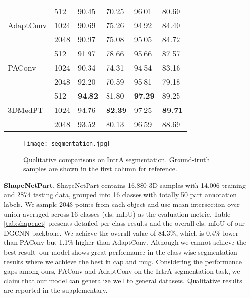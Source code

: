 \documentclass[10pt,twocolumn,letterpaper]{article}
\begin{document}
\begin{table}
\begin{tabular}{l|lllll}
\hline
\multirow{3}{*}{AdaptConv \cite{adapconv}}          & \cellcolor{Apricot}512  & \cellcolor{Apricot}90.45 & \cellcolor{Apricot}70.25 & \cellcolor{Apricot}96.01 & \cellcolor{Apricot}80.60 \\
                                                    & 1024 & 90.69 & 75.26 & 94.92 & 84.40 \\
                                                    & \cellcolor{Lavender}2048 & \cellcolor{Lavender}90.97 & \cellcolor{Lavender}75.08 & \cellcolor{Lavender}95.05 & \cellcolor{Lavender}84.72 \\ 
\hline
\multirow{3}{*}{PAConv \cite{paconv}}               & \cellcolor{Apricot}512  & \cellcolor{Apricot}91.97 & \cellcolor{Apricot}78.66 & \cellcolor{Apricot}95.66 & \cellcolor{Apricot}87.57 \\
                                                    & 1024 & 90.34 & 74.31 & 94.54 & 83.16 \\
                                                    & \cellcolor{Lavender}2048 & \cellcolor{Lavender}92.20 & \cellcolor{Lavender}70.59 & \cellcolor{Lavender}95.81 & \cellcolor{Lavender}79.18 \\ 
\hline
\multirow{3}{*}{3DMedPT}                        & \cellcolor{Apricot}512 & \cellcolor{Apricot}\textbf{94.82} & \cellcolor{Apricot}81.80 & \cellcolor{Apricot}\textbf{97.29} & \cellcolor{Apricot}89.25  \\
                                                & 1024 & 94.76 & \textbf{82.39} & 97.25 & \textbf{89.71} \\
                                                & \cellcolor{Lavender}2048 & \cellcolor{Lavender}93.52 & \cellcolor{Lavender}80.13 & \cellcolor{Lavender}96.59 & \cellcolor{Lavender}88.69 \\
\bottomrule
\end{tabular}
\end{table}

\begin{figure}
\centering
\texttt{[image: segmentation.jpg]}
\caption{Qualitative comparisons on IntrA segmentation. Ground-truth samples are shown in the first column for reference.} \label{fig:seg_result}
\end{figure}

\noindent \textbf{ShapeNetPart.}
ShapeNetPart \cite{shapenet} contains 16,880 3D samples with 14,006 training and 2874 testing data, grouped into 16 classes with totally 50 part annotation labels.
We sample 2048 points from each object and use mean intersection over union averaged across 16 classes (cls. mIoU) as the evaluation metric.
Table \ref{tab:shapenet} presents detailed per-class results and the overall cls. mIoU of our DGCNN backbone.
We achieve the overall value of 84.3\%, which is 0.4\% lower than PAConv but 1.1\% higher than AdaptConv.
Although we cannot achieve the best result, our model shows great performance in the class-wise segmentation results where we achieve the best in cap and mug.
Considering the performance gaps among ours, PAConv and AdaptConv on the IntrA segmentation task, we claim that our model can generalize well to general datasets.
Qualitative results are reported in the supplementary.
\end{document}
